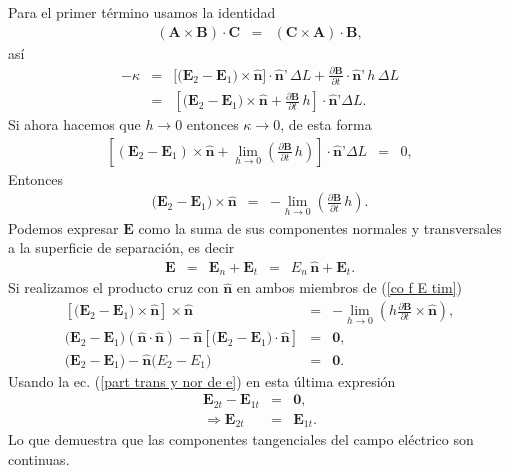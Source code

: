 \documentclass[11pt,fleqn]{book} %
\begin{document}
Para el primer t\'ermino usamos la identidad
\begin{eqnarray}
(\textbf{A}\times\textbf{B})\cdot\textbf{C}&=&(\textbf{C}\times\textbf{A})\cdot\textbf{B},
\end{eqnarray}
as\'i
\begin{eqnarray}
-\kappa&=&\big[\big(\textbf{E}_2-\textbf{E}_1\big)\times\hat{\textbf{n}}\big]\cdot\hat{\textbf{n}}\textbf{'}\,\Delta L+\frac{\partial\textbf{B}}{\partial t}\cdot\hat{\textbf{n}}\textbf{'}\,h\,\Delta L\nonumber\\
&=&\left[ \big(\textbf{E}_2-\textbf{E}_1\big)\times\hat{\textbf{n}}+\frac{\partial\textbf{B}}{\partial t}\,h\right] \cdot\hat{\textbf{n}}\textbf{'}\Delta L.
\end{eqnarray}
Si ahora hacemos que $h\rightarrow 0$ entonces $\kappa\rightarrow 0$, de esta forma
\begin{eqnarray}
\left[ \left( \textbf{E}_2-\textbf{E}_1\right) \times\hat{\textbf{n}}+\lim_{h\rightarrow 0}\left( \frac{\partial\textbf{B}}{\partial t}\,h\right) \right] \cdot\hat{\textbf{n}}\textbf{'}\Delta L&=&0,
\end{eqnarray}
Entonces
\begin{eqnarray}
\big(\textbf{E}_2-\textbf{E}_1\big)\times\hat{\textbf{n}}&=&-\lim_{h\rightarrow 0}\left( \frac{\partial\textbf{B}}{\partial t}\,h\right).\label{co f E tim}
\end{eqnarray}
Podemos expresar $\textbf{E}$ como la suma de sus componentes normales y transversales a la superficie de separaci\'on, es decir
\begin{eqnarray}
\textbf{E}&=&\textbf{E}_n+\textbf{E}_t\,\,\,=\,\,\,E_n\,\hat{\textbf{n}}+\textbf{E}_t.\label{part trans y nor de e}
\end{eqnarray}
Si realizamos el producto cruz con $\hat{\textbf{n}}$ en ambos miembros de (\ref{co f E tim})
\begin{eqnarray}
\left[ \big(\textbf{E}_{2}-\textbf{E}_{1}\big)\times\hat{\textbf{n}}\right] \times\hat{\textbf{n}}&=&-\lim_{h\rightarrow 0}\left( h\frac{\partial\textbf{B}}{\partial t}\times\hat{\textbf{n}}\right),\nonumber\\
\big(\textbf{E}_{2}-\textbf{E}_{1}\big)(\hat{\textbf{n}}\cdot\hat{\textbf{n}})-\hat{\textbf{n}}\left[ \big(\textbf{E}_{2}-\textbf{E}_{1}\big)\cdot \hat{\textbf{n}}\right]&=&\textbf{0},\nonumber\\
\big(\textbf{E}_{2}-\textbf{E}_{1}\big)-\hat{\textbf{n}}\big(E_{2}-E_{1}\big)&=&\textbf{0}.
\end{eqnarray}
Usando la ec. (\ref{part trans y nor de e}) en esta \'ultima expresi\'on
\begin{eqnarray}
\textbf{E}_{2t}-\textbf{E}_{1t}&=&\textbf{0},\nonumber\\
\Rightarrow\textbf{E}_{2t}&=&\textbf{E}_{1t}.
\end{eqnarray}
Lo que demuestra que las componentes tangenciales del campo el\'ectrico son continuas.
\end{document}
